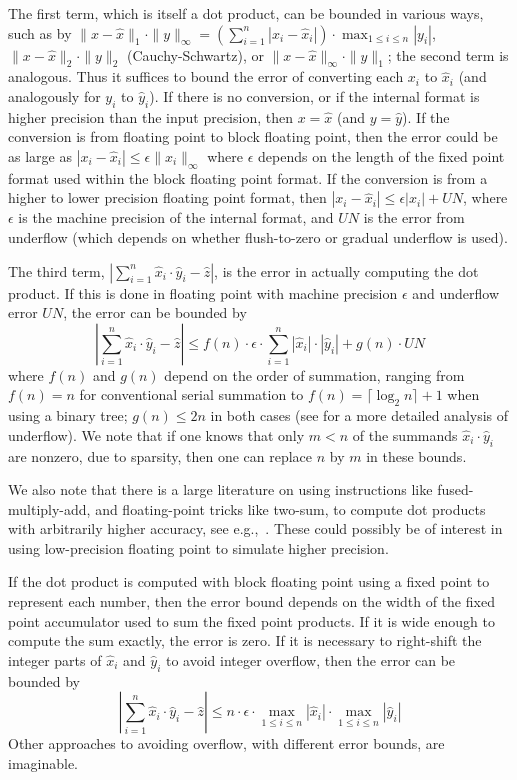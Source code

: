 \documentclass[manuscript,review]{acmart}
\begin{document}
The first term, which is itself a dot product, can be
bounded in various ways, such as by 
$\|x - \hat{x}\|_{1} \cdot \|y\|_{\infty} = (\sum_{i=1}^n |x_i - \hat{x}_i |) \cdot \max_{1 \leq i \leq n} |y_i|$,
$\|x - \hat{x}\|_{2} \cdot \|y\|_{2}$ (Cauchy-Schwartz), or
$\|x - \hat{x}\|_{\infty} \cdot \|y\|_{1}$; the second
term is analogous. Thus it suffices to bound the error of
converting each $x_i$ to $\hat{x}_i$ (and analogously for $y_i$ to
$\hat{y}_i$). If there is no conversion, or if the internal format
is higher precision than the input precision, then $x=\hat{x}$
(and $y=\hat{y}$). If the conversion is from floating point to
block floating point, then the error could be as large as
$| x_i - \hat{x}_i | \leq \epsilon \| x_i \|_{\infty}$ where
$\epsilon$ depends on the length of the fixed point format used
within the block floating point format. If the conversion is
from a higher to lower precision floating point format, then
$| x_i - \hat{x}_i | \leq \epsilon | x_i | + UN$, where
$\epsilon$ is the machine precision of the internal format,
and $UN$ is the error from underflow (which depends on whether
flush-to-zero or gradual underflow is used).

The third term, $|\sum_{i=1}^n \hat{x}_i \cdot \hat{y}_i - \hat{z} |$,
is the error in actually computing the dot product.
If this is done in floating point with machine precision $\epsilon$
and underflow error $UN$, the error can be bounded by
\[
|\sum_{i=1}^n \hat{x}_i \cdot \hat{y}_i - \hat{z} | \leq
f(n) \cdot \epsilon \cdot \sum_{i=1}^n |\hat{x}_i| \cdot |\hat{y}_i| + g(n) \cdot UN
\]
where $f(n)$ and $g(n)$ depend on the order of summation, ranging
from $f(n)=n$ for conventional serial summation to 
$f(n) = \lceil \log_2 n \rceil + 1$ when using a binary tree;
$g(n) \leq 2n$ in both cases (see \cite{Demmel84} for a more detailed
analysis of underflow). We note that if one knows that only $m < n$ of 
the summands $\hat{x}_i \cdot \hat{y}_i$ are nonzero, due to sparsity,
then one can replace $n$ by $m$ in these bounds.

We also note that there is a large literature
on using instructions like fused-multiply-add, and floating-point
tricks like two-sum, to compute dot products with arbitrarily higher
accuracy, see e.g.,~\cite{doi:10.1137/030601818,https://doi.org/10.1002/spe.3041}. These could possibly be of interest in using low-precision
floating point to simulate higher precision.

If the dot product is computed with block floating point using
a fixed point to represent each number, then the error bound depends
on the width of the fixed point accumulator used to sum the
fixed point products. If it is wide enough to compute the sum exactly,
the error is zero. If it is necessary to right-shift the integer
parts of $\hat{x}_i$ and $\hat{y}_i$ to avoid integer overflow, 
then the error can be bounded by
\[
|\sum_{i=1}^n \hat{x}_i \cdot \hat{y}_i - \hat{z} | \leq
n \cdot \epsilon \cdot \max_{1 \leq i \leq n} |\hat{x}_i| \cdot \max_{1 \leq i \leq n} |\hat{y}_i| 
\]
Other approaches to avoiding overflow, with different error bounds,
are imaginable. 
\end{document}
